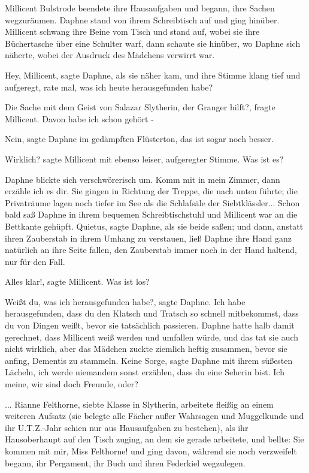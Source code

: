 Millicent Bulstrode beendete ihre Hausaufgaben und begann, ihre Sachen
wegzuräumen. Daphne stand von ihrem Schreibtisch auf und ging hinüber. Millicent
schwang ihre Beine vom Tisch und stand auf, wobei sie ihre Büchertasche über
eine Schulter warf, dann schaute sie hinüber, wo Daphne sich näherte, wobei der
Ausdruck des Mädchens verwirrt war.

\glqq{}Hey, Millicent\grqq{}, sagte Daphne, als sie näher kam, und ihre Stimme
klang tief und aufgeregt, \glqq{}rate mal, was ich heute herausgefunden
habe?\grqq{}

\glqq{}Die Sache mit dem Geist von Salazar Slytherin, der Granger hilft?\grqq{},
fragte Millicent. \glqq{}Davon habe ich schon gehört -\grqq{}

\glqq{}Nein\grqq{}, sagte Daphne im gedämpften Flüsterton, \glqq{}das ist sogar
noch besser.\grqq{}

\glqq{}Wirklich?\grqq{} sagte Millicent mit ebenso leiser, aufgeregter Stimme.
\glqq{}Was ist es?\grqq{}

Daphne blickte sich verschwörerisch um. \glqq{}Komm mit in mein Zimmer, dann
erzähle ich es dir.\grqq{} Sie gingen in Richtung der Treppe, die nach unten
führte; die Privaträume lagen noch tiefer im See als die Schlafsäle der
Siebtklässler... Schon bald saß Daphne in ihrem bequemen Schreibtischstuhl und
Millicent war an die Bettkante gehüpft. \glqq{}Quietus\grqq{}, sagte Daphne, als
sie beide saßen; und dann, anstatt ihren Zauberstab in ihrem Umhang zu
verstauen, ließ Daphne ihre Hand ganz natürlich an ihre Seite fallen, den
Zauberstab immer noch in der Hand haltend, nur für den Fall.

\glqq{}Alles klar!\grqq{}, sagte Millicent. \glqq{}Was ist los?\grqq{}

\glqq{}Weißt du, was ich herausgefunden habe?\grqq{}, sagte Daphne. \glqq{}Ich
habe herausgefunden, dass du den Klatsch und Tratsch so schnell mitbekommst,
dass du von Dingen weißt, bevor sie tatsächlich passieren.\grqq{} Daphne hatte
halb damit gerechnet, dass Millicent weiß werden und umfallen würde, und das tat
sie auch nicht wirklich, aber das Mädchen zuckte ziemlich heftig zusammen, bevor
sie anfing, Dementis zu stammeln. \glqq{}Keine Sorge\grqq{}, sagte Daphne mit
ihrem süßesten Lächeln, \glqq{}ich werde niemandem sonst erzählen, dass du eine
Seherin bist. Ich meine, wir sind doch Freunde, oder?\grqq{}

... Rianne Felthorne, siebte Klasse in Slytherin, arbeitete fleißig an einem
weiteren Aufsatz (sie belegte alle Fächer außer Wahrsagen und Muggelkunde und
ihr U.T.Z.-Jahr schien nur aus Hausaufgaben zu bestehen), als ihr Hausoberhaupt
auf den Tisch zuging, an dem sie gerade arbeitete, und bellte: \glqq{}Sie kommen
mit mir, Miss Felthorne!\grqq{} und ging davon, während sie noch verzweifelt
begann, ihr Pergament, ihr Buch und ihren Federkiel wegzulegen.

